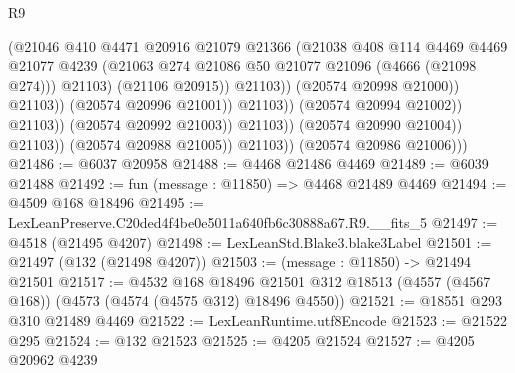 \begin{lexlean}{R9}
\begin{coremodule}
                                                (@21046
                                                  @410
                                                  @4471
                                                  @20916
                                                  @21079
                                                  @21366
                                                  (@21038
                                                    @408
                                                    @114
                                                    @4469
                                                    @4469
                                                    @21077
                                                    @4239
                                                    (@21063
                                                      @274
                                                      @21086
                                                      @50
                                                      @21077
                                                      @21096
                                                      (@4666 (@21098 @274)))
                                                    @21103)
                                                  (@21106 @20915))
                                                @21103))
                                            (@20574 @20998 @21000))
                                          @21103))
                                      (@20574 @20996 @21001))
                                    @21103))
                                (@20574 @20994 @21002))
                              @21103))
                          (@20574 @20992 @21003))
                        @21103))
                    (@20574 @20990 @21004))
                  @21103))
              (@20574 @20988 @21005))
            @21103))
        (@20574 @20986 @21006)))
@21486 := @6037 @20958
@21488 := @4468 @21486 @4469
@21489 := @6039 @21488
@21492 := fun (message : @11850) => @4468 @21489 @4469
@21494 := @4509 @168 @18496
@21495 := LexLeanPreserve.C20ded4f4be0e5011a640fb6c30888a67.R9.__fits_5
@21497 := @4518 (@21495 @4207)
@21498 := LexLeanStd.Blake3.blake3Label
@21501 := @21497 (@132 (@21498 @4207))
@21503 := (message : @11850) -> @21494 @21501
@21517 := @4532
    @168
    @18496
    @21501
    @312
    @18513
    (@4557 (@4567 @168))
    (@4573 (@4574 (@4575 @312) @18496 @4550))
@21521 := @18551 @293 @310 @21489 @4469
@21522 := LexLeanRuntime.utf8Encode
@21523 := @21522 @295
@21524 := @132 @21523
@21525 := @4205 @21524
@21527 := @4205 @20962 @4239

\end{coremodule}
\end{lexlean}
